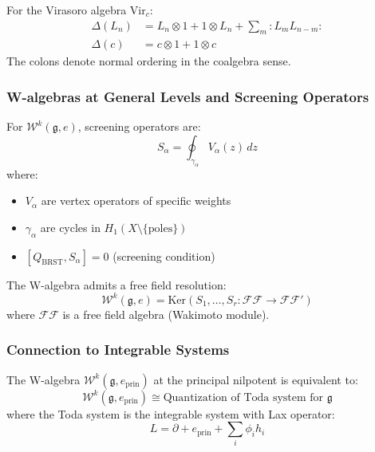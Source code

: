 \begin{example}
For the Virasoro algebra $\mathrm{Vir}_c$:
\begin{align}
\Delta(L_n) &= L_n \otimes 1 + 1 \otimes L_n + \sum_{m} :L_m L_{n-m}: \\
\Delta(c) &= c \otimes 1 + 1 \otimes c
\end{align}
The colons denote normal ordering in the coalgebra sense.
\end{example}

\subsubsection{W-algebras at General Levels and Screening Operators}

\begin{definition}\label{def:screening}
For $\mathcal{W}^k(\mathfrak{g}, e)$, screening operators are:
\[
S_{\alpha} = \oint_{\gamma_\alpha} V_\alpha(z) \, dz
\]
where:
\begin{itemize}
\item $V_\alpha$ are vertex operators of specific weights
\item $\gamma_\alpha$ are cycles in $H_1(X \setminus \{\text{poles}\})$
\item $[Q_{\mathrm{BRST}}, S_\alpha] = 0$ (screening condition)
\end{itemize}
\end{definition}

\begin{theorem}\label{thm:screen-res}
The W-algebra admits a free field resolution:
\[
\mathcal{W}^k(\mathfrak{g}, e) = \mathrm{Ker}(S_1, \ldots, S_r : \mathcal{FF} \to \mathcal{FF}')
\]
where $\mathcal{FF}$ is a free field algebra (Wakimoto module).
\end{theorem}

\subsubsection{Connection to Integrable Systems}

\begin{theorem}\label{thm:w-toda}
The W-algebra $\mathcal{W}^k(\mathfrak{g}, e_{\mathrm{prin}})$ at the principal nilpotent is equivalent to:
\[
\mathcal{W}^k(\mathfrak{g}, e_{\mathrm{prin}}) \cong \text{Quantization of Toda system for } \mathfrak{g}
\]
where the Toda system is the integrable system with Lax operator:
\[
L = \partial + e_{\mathrm{prin}} + \sum_{i} \phi_i h_i
\]
\end{theorem}

